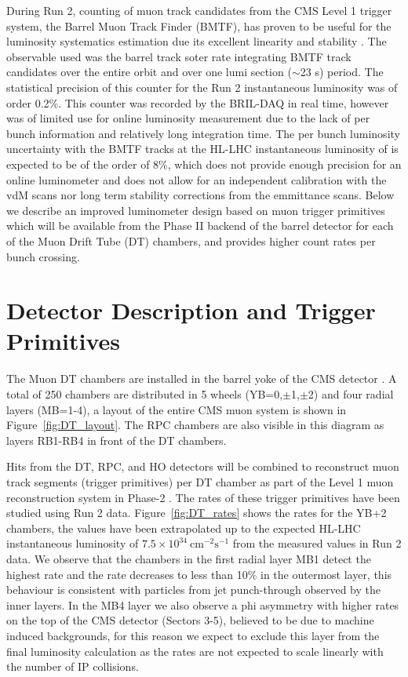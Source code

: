 During Run 2, counting of muon track candidates from the CMS Level 1 trigger system, the Barrel Muon Track Finder (BMTF),
has proven to be useful for the luminosity systematics estimation due its excellent linearity and stability \cite{LUM-17-001}.
The observable used was the barrel track soter rate integrating BMTF track candidates
 over the entire orbit and over one lumi section ($\sim$23 s) period.
The statistical precision of this counter for the Run 2 instantaneous luminosity was of order 0.2\%.
This counter was recorded by the BRIL-DAQ in real time,
however was of limited use for online luminosity measurement due to the
lack of per bunch information and relatively long integration time.
The per bunch luminosity uncertainty with the BMTF tracks at the HL-LHC instantaneous luminosity of is expected to be of the order of 8\%,
which does not provide enough precision for an online luminometer and does not allow for an independent calibration
with the vdM scans nor long term stability corrections from the emmittance scans.
Below we describe an improved luminometer design based on muon trigger primitives which will be available 
from the Phase II backend of the  barrel detector for each of the Muon Drift Tube (DT) chambers,
and provides higher count rates per bunch crossing.


\section{Detector Description and Trigger Primitives}

The Muon DT chambers are installed in the barrel yoke of the CMS detector \cite{DT-2009}.
A total of 250 chambers are distributed in 5 wheels (YB=0,$\pm$1,$\pm$2) and four radial layers (MB=1-4),
a layout of the entire  CMS muon system is shown in Figure~\ref{fig:DT_layout}.
The RPC chambers are also visible in this diagram as layers RB1-RB4 in front of the DT chambers.

Hits from the DT, RPC, and HO detectors will be combined to reconstruct muon track segments (trigger primitives) per DT chamber as part of the  Level 1 muon reconstruction system in Phase-2 \cite{CERN-LHCC-2017-012}.
The rates of these trigger primitives have been studied using Run 2 data.
Figure~\ref{fig:DT_rates} shows the rates for the YB+2  chambers,
the values have been extrapolated up to the expected HL-LHC instantaneous luminosity of  $7.5\times10^{34}\ \text{cm}^{-2}\text{s}^{-1}$ from the measured values in Run 2 data.
We observe that the chambers in the first radial layer MB1 detect the highest rate and the rate decreases to less than 10\% in the outermost layer,
this behaviour is consistent with particles from jet punch-through observed by the inner layers.
In the MB4 layer we also observe a phi asymmetry with higher rates on the top of the CMS detector (Sectors 3-5), believed to be due to machine induced backgrounds,
for this reason we expect to exclude this layer from the final luminosity calculation as the rates are not expected to scale linearly with the number of IP collisions. 


